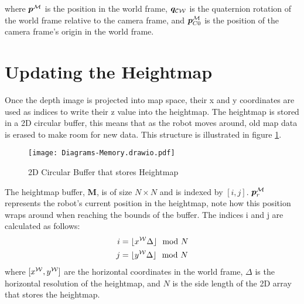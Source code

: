         \noindent
        where \(\boldsymbol{p}\inrefframe{\fmap}\) is the position in the world frame, \(\boldsymbol{q}_{\fcamera\fworld}\) is the quaternion rotation of the world frame relative to the camera frame, and \(\boldsymbol{p}\inrefframe{\fmap}_{C0}\) is the position of the camera frame's origin in the world frame.

    \newpage
    \section{Updating the Heightmap}
        Once the depth image is projected into map space, their x and y coordinates are used as indices to write their z value into the heightmap. The heightmap is stored in
        a 2D circular buffer, this means that as the robot moves around, old map data is erased to make room for new data. This structure is illustrated in figure \ref{fig:memory}.
        \begin{figure}[h]
            \centering
            \texttt{[image: Diagrams-Memory.drawio.pdf]}
            \caption{2D Circular Buffer that stores Heightmap}
            \label{fig:memory}
        \end{figure}

        \noindent
        The heightmap buffer, \(\bm{M}\), is of size \(N \times N\) and is indexed by \([i,j]\). \(\boldsymbol{p}\inrefframe{\fmap}_r\) represents the robot's current position in the heightmap, note how this position wraps around when reaching the bounds of the buffer. The indices i and j are calculated as follows:
        \begin{align} \label{eq:map_index}
            \begin{split}
                i &= \lfloor x\inrefframe{\fworld} \Delta \rfloor \mod{N} \\
                j &= \lfloor y\inrefframe{\fworld} \Delta \rfloor \mod{N}
            \end{split}
        \end{align}
        where \([x\inrefframe{\fworld}, y\inrefframe{\fworld}]\) are the horizontal coordinates in the world frame, \(\Delta\) is the horizontal resolution of the heightmap, and \(N\) is the side length of the 2D array that stores the heightmap.
        
    \newpage
